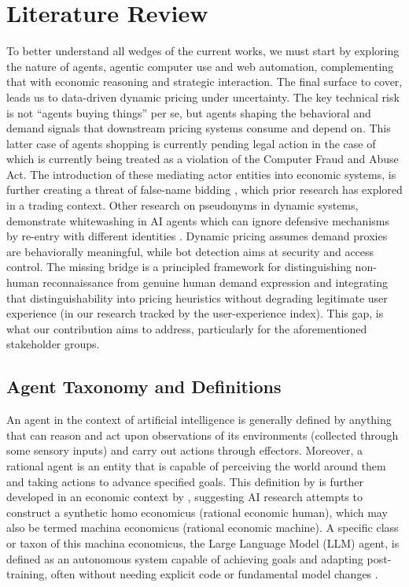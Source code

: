 \section{Literature Review}

To better understand all wedges of the current works, we must start by exploring the nature of agents, agentic computer use and web automation, complementing that with economic reasoning and strategic interaction. The final surface to cover, leads us to data-driven dynamic pricing under uncertainty. The key technical risk is not ``agents buying things'' per se, but agents shaping the behavioral and demand signals that downstream pricing systems consume and depend on. This latter case of agents shopping is currently pending legal action in the case of \textcite{noauthor_amazoncom_2026} which is currently being treated as a violation of the Computer Fraud and Abuse Act. The introduction of these mediating actor entities into economic systems, is further creating a threat of false-name bidding \parencite{yokoo_effect_2004}, which prior research has explored in a trading context. Other research on pseudonyms in dynamic systems, demonstrate whitewashing in AI agents which can ignore defensive mechanisms by re-entry with different identities \parencite{feldman_free-riding_2004}. Dynamic pricing assumes demand proxies are behaviorally meaningful, while bot detection aims at security and access control. The missing bridge is a principled framework for distinguishing non-human reconnaissance from genuine human demand expression and integrating that distinguishability into pricing heuristics without degrading legitimate user experience (in our research tracked by the user-experience index). This gap, is what our contribution aims to address, particularly for the aforementioned stakeholder groups.

\subsection{Agent Taxonomy and Definitions}

An agent in the context of artificial intelligence is generally defined by anything that can reason and act upon observations of its environments (collected through some sensory inputs) and carry out actions through effectors. Moreover, a rational agent is an entity that is capable of perceiving the world around them and taking actions to advance specified goals. This definition by \textcite{russell_artificial_2021} is further developed in an economic context by \textcite{parkes_economic_2015}, suggesting AI research attempts to construct a synthetic homo economicus (rational economic human), which may also be termed machina economicus (rational economic machine).
A specific class or taxon of this machina economicus, the Large Language Model (LLM) agent, is defined as an autonomous system capable of achieving goals and adapting post-training, often without needing explicit code or fundamental model changes \parencite{xia_evaluation-driven_2025}.

